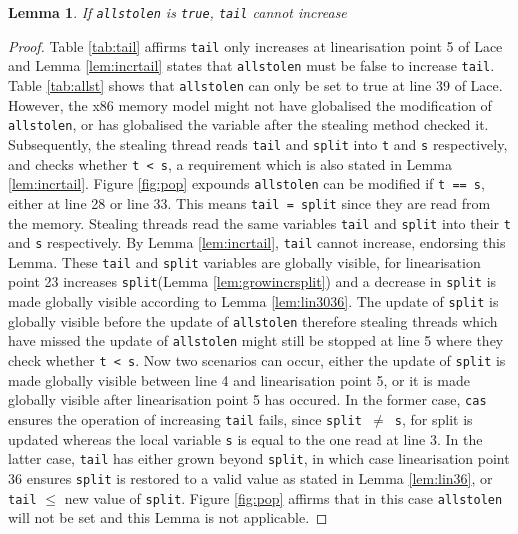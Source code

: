 \documentclass{sig-alternate-br}
\newtheorem{lemma}{Lemma}
\begin{document}
\begin{lemma}
	If \texttt{allstolen} is \texttt{true}, \texttt{tail} cannot increase
	\label{lem:allst.incrtail}
\end{lemma}
\begin{proof}
	Table \ref{tab:tail} affirms \texttt{tail} only increases at linearisation point 5 of Lace and Lemma \ref{lem:incrtail} states that \texttt{allstolen} must be false to increase \texttt{tail}.
	Table \ref{tab:allst} shows that \texttt{allstolen} can only be set to true at line 39 of Lace.	
	However, the x86 memory model might not have globalised the modification of \texttt{allstolen}, or has globalised the variable after the stealing method checked it.
	Subsequently, the stealing thread reads \texttt{tail} and \texttt{split} into \texttt{t} and \texttt{s} respectively, and checks whether \texttt{t < s}, a requirement which is also stated in Lemma \ref{lem:incrtail}.	
	Figure \ref{fig:pop} expounds \texttt{allstolen} can be modified if \texttt{t == s}, either at line 28 or line 33.
	This means \texttt{tail = split} since they are read from the memory.
	Stealing threads read the same variables \texttt{tail} and \texttt{split} into their \texttt{t} and \texttt{s} respectively.
	By Lemma \ref{lem:incrtail}, \texttt{tail} cannot increase, endorsing this Lemma.
	These \texttt{tail} and \texttt{split} variables are globally visible, for linearisation point 23 increases \texttt{split}(Lemma \ref{lem:growincrsplit}) and a decrease in \texttt{split} is made globally visible according to Lemma \ref{lem:lin3036}.
	The update of \texttt{split} is globally visible before the update of \texttt{allstolen} therefore stealing threads which have missed the update of \texttt{allstolen} might still be stopped at line 5 where they check whether \texttt{t < s}.	
	Now two scenarios can occur, either the update of \texttt{split} is made globally visible between line 4 and linearisation point 5, or it is made globally visible after linearisation point 5 has occured.
	In the former case, \texttt{cas} ensures the operation of increasing \texttt{tail} fails, since \texttt{split $\neq$ s}, for split is updated whereas the local variable \texttt{s} is equal to the one read at line 3.
	In the latter case, \texttt{tail} has either grown beyond \texttt{split}, in which case linearisation point 36 ensures \texttt{split} is restored to a valid value as stated in Lemma \ref{lem:lin36}, or \texttt{tail} $\leq$ new value of \texttt{split}.
	Figure \ref{fig:pop} affirms that in this case \texttt{allstolen} will not be set and this Lemma is not applicable.
\end{proof}
\end{document}
